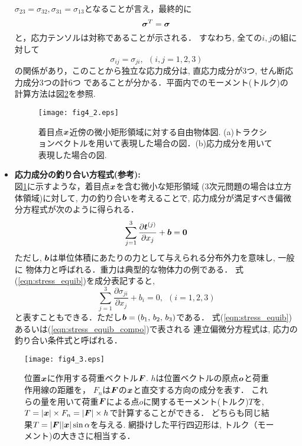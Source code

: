\documentclass[10pt,a4j]{jbook}
\begin{document}
\begin{itemize}
	$\sigma_{23}=\sigma_{32}, \sigma_{31}=\sigma_{13}$となることが言え，最終的に
	\begin{equation}
		\mbox{\boldmath $\sigma$}^{T}=\mbox{\boldmath $\sigma$}
		\label{eqn:sig_sym}
	\end{equation}
	と，応力テンソルは対称であることが示される．
	すなわち, 全ての$i,j$の組に対して
	\begin{equation}
		\sigma_{ij}=\sigma_{ji}, \ \ (i,j=1,2,3)
		\label{eqn:sig_sym_comp}
	\end{equation}
	の関係があり，このことから独立な応力成分は, 直応力成分が3つ, せん断応力成分3つの計6つ
	であることが分かる．平面内でのモーメント(トルク)の
	計算方法は図\ref{fig:fig4_2}を参照.
\begin{figure}[h]
	\begin{center}
	\texttt{[image: fig4\_2.eps]} 
	\end{center}
	\caption{着目点$\mbox{\boldmath $x$}$近傍の微小矩形領域に対する自由物体図.
	(a)トラクションベクトルを用いて表現した場合の図．(b)応力成分を用いて表現した場合の図.} 
	\label{fig:fig4_1}
\end{figure}
\item
	{\bf 応力成分の釣り合い方程式(参考):}\\
	図\ref{fig:fig4_1}に示すような，着目点$\mbox{\boldmath $x$}$を含む微小な矩形領域
	(3次元問題の場合は立方体領域)に対して, 力の釣り合いを考えることで, 
	応力成分が満足すべき偏微分方程式が次のように得られる．
	\begin{equation}
		\sum_{j=1}^3 \frac{\partial \mbox{\boldmath $t$}^{(j)}}{\partial x_j}+\mbox{\boldmath $b$}=\mbox{\boldmath $0$}
		\label{eqn:stress_equib}
	\end{equation}
	ただし, $\mbox{\boldmath $b$}$は単位体積にあたりの力として与えられる分布外力を意味し, 一般に
	物体力と呼ばれる．重力は典型的な物体力の例である．
	式(\ref{eqn:stress_equib})を成分表記すると, 
	\begin{equation}
		\sum_{j=1}^3 \frac{\partial \sigma_{ji}}{\partial x_j}+b_i=0, \ \ (i=1,2,3)
		\label{eqn:stress_equib_compo}
	\end{equation}
	と表すこともできる．ただし$\mbox{\boldmath $b$}=(b_1,\,b_2,\, b_3)$である．
	式(\ref{eqn:stress_equib})あるいは(\ref{eqn:stress_equib_compo})で表される
	連立偏微分方程式は, 応力の釣り合い条件式と呼ばれる．
\end{itemize}
\begin{figure}[h]
	\begin{center}
	\texttt{[image: fig4\_3.eps]} 
	\end{center}
	\caption{
	位置$\mbox{\boldmath $x$}$に作用する荷重ベクトル$\mbox{\boldmath $F$}$.
	$h$は位置ベクトルの原点$\mbox{\boldmath $o$}$と荷重作用線の距離を，
	$F_n$は$\mbox{\boldmath $F$}$の$\mbox{\boldmath $x$}$と直交する方向の成分を表す．
	これらの量を用いて荷重$\mbox{\boldmath $F$}$による点$o$に関するモーメント(トルク)$T$を,
	$T=|\mbox{\boldmath $x$}|\times F_n=|\mbox{\boldmath $F$}|\times h$で計算することができる．
	どちらも同じ結果$T=|\mbox{\boldmath $F$}| |\mbox{\boldmath $x$}|\sin\alpha$を与える.
	網掛けした平行四辺形は, トルク（モーメント)の大きさに相当する．
	 } 
	\label{fig:fig4_2}
\end{figure}
\end{document}
